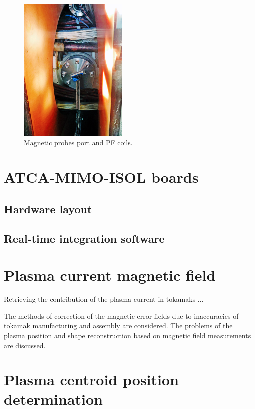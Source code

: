 \begin{figure}[htbp]
	\centering
	\includegraphics[width=0.465\textwidth]{Chp4/PuertoMirnov.png}
	\caption{\label{MirnPort} Magnetic probes port and PF coils. }
\end{figure}



\section{ATCA-MIMO-ISOL boards}
\subsection{Hardware layout}
\subsection{Real-time  integration software}
\section{Plasma current magnetic field }

Retrieving the contribution of the plasma current in tokamaks ...

The methods of correction of the magnetic error fields due to inaccuracies
of tokamak manufacturing and assembly are considered. The problems of the
plasma position and shape reconstruction based on magnetic field measurements are discussed.

\section{Plasma centroid position determination}